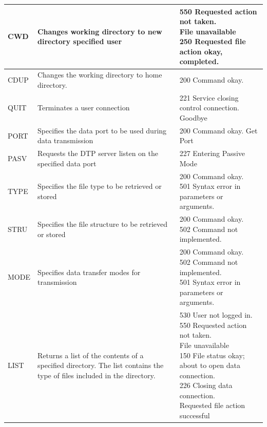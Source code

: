 \documentclass[10pt,twocolumn]{witseiepaper}
\begin{document}
\begin{appendices}
\begin{longtable}{|p{2cm}|p{7cm}|p{8cm}|}
	CWD	& Changes working directory to new directory specified user  & \makecell[l]{550 Requested action not taken. \\File unavailable \\250 Requested file action okay, completed.} \\ 
	\hline
	
	CDUP	& Changes the working directory to home directory. & 200 Command okay. \\ 
	\hline 
	
	QUIT	& Terminates a user connection &  221 Service closing control connection. Goodbye\\ 
	\hline 
	
	PORT	& Specifies the data port to be used during data transmission & 200 Command okay. Get Port \\ 
	\hline 
	
	PASV	& Requests the DTP server listen on the specified data port & 227 Entering Passive Mode\\ 
	\hline
	
	TYPE	& Specifies the file type to be retrieved or stored & \makecell[l]{200 Command okay. \\501 Syntax error in parameters or arguments.}\\ 
	\hline  
	
	STRU	& Specifies the file structure to be retrieved or stored  & \makecell[l]{200 Command okay. \\502 Command not implemented.} \\ 
	\hline 
	
	MODE	& Specifies data transfer modes for transmission & \makecell[l]{200 Command okay. \\502 Command not implemented. \\501 Syntax error in parameters or arguments.} \\ 
	\hline 


	LIST & Returns a list of the contents of a specified directory. The list contains the type of files included in the directory. &\makecell[l]{530 User not logged in. \\550 Requested action not taken. \\ File unavailable \\150 File status okay; about to open data connection. \\226 Closing data connection.\\ Requested file action successful}\\ 
	\hline 


\end{longtable}
\end{appendices}
\end{document}
